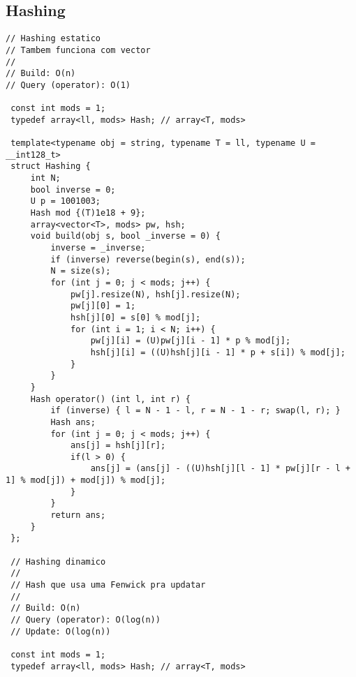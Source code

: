 \documentclass[11pt, a4paper, twoside]{article}
\begin{document}
\subsection{Hashing}
\begin{lstlisting}
// Hashing estatico
// Tambem funciona com vector
//
// Build: O(n)
// Query (operator): O(1)

 const int mods = 1;
 typedef array<ll, mods> Hash; // array<T, mods>
 
 template<typename obj = string, typename T = ll, typename U = __int128_t> 
 struct Hashing {
     int N;
     bool inverse = 0;
     U p = 1001003;
     Hash mod {(T)1e18 + 9};
     array<vector<T>, mods> pw, hsh;
     void build(obj s, bool _inverse = 0) {
         inverse = _inverse;
         if (inverse) reverse(begin(s), end(s));
         N = size(s);
         for (int j = 0; j < mods; j++) {
             pw[j].resize(N), hsh[j].resize(N);
             pw[j][0] = 1;
             hsh[j][0] = s[0] % mod[j];
             for (int i = 1; i < N; i++) {
                 pw[j][i] = (U)pw[j][i - 1] * p % mod[j];
                 hsh[j][i] = ((U)hsh[j][i - 1] * p + s[i]) % mod[j];
             }
         }
     }
     Hash operator() (int l, int r) {
         if (inverse) { l = N - 1 - l, r = N - 1 - r; swap(l, r); }
         Hash ans;
         for (int j = 0; j < mods; j++) {
             ans[j] = hsh[j][r];
             if(l > 0) {
                 ans[j] = (ans[j] - ((U)hsh[j][l - 1] * pw[j][r - l + 1] % mod[j]) + mod[j]) % mod[j];
             }
         }
         return ans;
     }
 };
 
 // Hashing dinamico
 //
 // Hash que usa uma Fenwick pra updatar
 //
 // Build: O(n)
 // Query (operator): O(log(n))
 // Update: O(log(n))
 
 const int mods = 1;
 typedef array<ll, mods> Hash; // array<T, mods>
 

\end{lstlisting}
\end{document}
